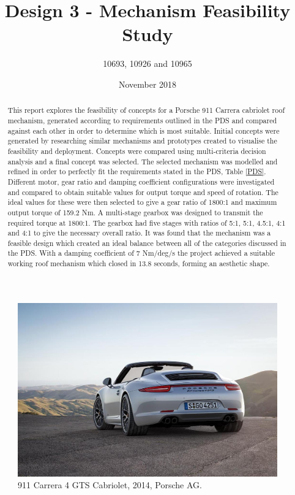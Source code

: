 \documentclass[a4paper]{article}
\title{Design 3 - Mechanism Feasibility Study}
\author{10693, 10926 and 10965}
\date{November 2018}
\renewcommand{\abstractname}{Summary}
\begin{document}
\maketitle
\renewcommand{\abstractname}{Summary}

\begin{figure}[H]
\centering
\includegraphics[width=1\textwidth]{Car.jpg}
\caption{911 Carrera 4 GTS Cabriolet, 2014, Porsche AG. \cite{porschenewsroom}}
\end{figure}

\begin{abstract}

This report explores the feasibility of concepts for a Porsche 911 Carrera cabriolet roof mechanism, generated according to requirements outlined in the PDS and compared against each other in order to determine which is most suitable. Initial concepts were generated by researching similar mechanisms and prototypes created to visualise the feasibility and deployment. Concepts were compared using multi-criteria decision analysis and a final concept was selected.  The selected mechanism was modelled and refined in order to perfectly fit the requirements stated in the PDS, Table \ref{PDS}. Different motor, gear ratio and damping coefficient configurations were investigated and compared to obtain suitable values for output torque and speed of rotation. The ideal values for these were then selected  to give a gear ratio of 1800:1 and maximum output torque of 159.2 Nm.  A multi-stage gearbox was designed to transmit the required torque at 1800:1. The gearbox had five stages with ratios of 5:1, 5:1, 4.5:1, 4:1 and 4:1 to give the necessary overall ratio. It was found that the mechanism was a feasible design which created an ideal balance between all of the categories discussed in the PDS. With a damping coefficient of 7 Nm/deg/s the project achieved a suitable working roof mechanism which closed in 13.8 seconds, forming an aesthetic shape.


\end{abstract}
\clearpage
\end{document}
